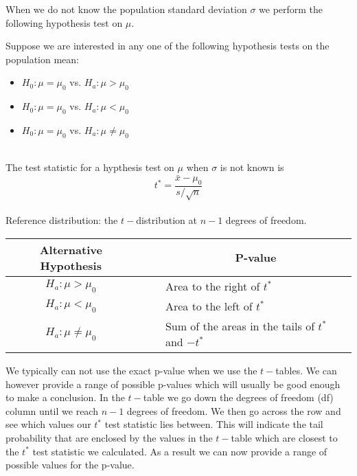 When we do not know the population standard deviation $\sigma$
we perform the following hypothesis test on $\mu$.

\begin{hyp}
Suppose we are interested in any one of the following hypothesis tests
on the population mean:\\

\begin{itemize}
\item	$H_{0} : \mu = \mu_{0}$  vs. $H_{a}  : \mu > \mu_{0}$
\item	$H_{0} : \mu = \mu_{0}$  vs. $H_{a}  : \mu < \mu_{0}$
\item	$H_{0} : \mu = \mu_{0}$  vs. $H_{a}  : \mu \neq \mu_{0}$
\end{itemize}

\hfill\\
The test statistic for a hypthesis test on $\mu$ when $\sigma$ is not known is
\begin{equation}\label{eqnCISigmaKnown}
t^{*}	= \frac{ \bar{x} - \mu_{0} }{ s / \sqrt{n} }
\end{equation}
\hfill\\
Reference distribution: the $t-$distribution at $n-1$ degrees of freedom.\\

\begin{center}
\begin{tabular}{ccl}
Alternative Hypothesis	&	~\quad~	&	\multicolumn{1}{c}{P-value}	\\
\hline
$H_{a}  : \mu > \mu_{0}$		&	&	Area to the right of $t^{*}$	\\
$H_{a}  : \mu < \mu_{0}$		&	&	Area to the left of $t^{*}$	\\
$H_{a}  : \mu \neq \mu_{0}$	&	&	Sum of the areas in the tails of $t^{*}$ and $-t^{*}$
\end{tabular}
\end{center}

\end{hyp}


\begin{nt}
We typically can not use the exact p-value when we use the $t-$tables.
We can however provide a range of possible p-values which will usually be 
good enough to make a conclusion.
In the $t-$table we go down the degrees of freedom (df) column until we reach $n-1$ degrees of freedom.
We then go across the row and see which values our $t^{*}$ test statistic lies between.
This will indicate the tail probability that are enclosed by the values in the $t-$table 
which are closest to the $t^{*}$ test statistic we calculated.
As a result we can now provide a range of possible values for the p-value.
\end{nt}


